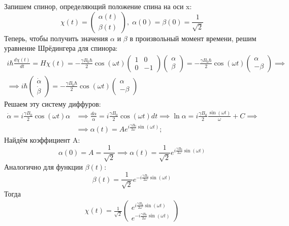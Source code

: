 Запишем спинор, определяющий положение спина на оси x:
\[
\chi(t) = \begin{pmatrix}\alpha(t)\\ \beta(t)\end{pmatrix}, \; \alpha(0) = \beta(0) = \frac{1}{\sqrt{2}}
\]
Теперь, чтобы получить значения $\alpha$ и $\beta$ в произвольный момент времени, решим уравнение Шрёдингера для спинора:
\begin{gather*}
i\hbar\frac{d\chi(t)}{dt} = H\chi(t) = -\frac{\gamma B_0\hbar}{2}\cos(\omega t)\begin{pmatrix} 1 & 0 \\ 0 & -1 \end{pmatrix}\begin{pmatrix}\alpha\\ \beta\end{pmatrix} =  -\frac{\gamma B_0\hbar}{2}\cos(\omega t) \begin{pmatrix} \alpha \\ -\beta \end{pmatrix} \implies \\
\implies i\hbar\begin{pmatrix} \dot{\alpha}\\ \dot{\beta} \end{pmatrix} = -\frac{\gamma B_0\hbar}{2}\cos(\omega t) \begin{pmatrix} \alpha \\ -\beta \end{pmatrix}
\end{gather*}
Решаем эту систему диффуров:
\begin{align*}
    \dot{\alpha} = i\frac{\gamma B_0}{2}\cos(\omega t)\alpha &\implies \frac{d\alpha}{\alpha} = i\frac{\gamma B_0}{2}\cos(\omega t)dt \implies \ln\alpha = i\frac{\gamma B_0}{2}\frac{\sin(\omega t)}{\omega} + C \implies \\ 
    & \implies \alpha(t) = Ae^{i\frac{\gamma B_0}{2\omega}\sin(\omega t)};
\end{align*}
Найдём коэффициент A:
\[
\alpha(0) = A = \frac{1}{\sqrt{2}} \implies \alpha(t) = \frac{1}{\sqrt{2}}e^{i\frac{\gamma B_0}{2\omega}\sin(\omega t)}
\]
Аналогично для функции $\beta(t)$:
\[
\beta(t) = \frac{1}{\sqrt{2}}e^{-i\frac{\gamma B_0}{2\omega}\sin(\omega t)}
\]
Тогда
\begin{align*}
\chi(t) = \frac{1}{\sqrt{2}}\begin{pmatrix} e^{i\frac{\gamma B_0}{2\omega}\sin(\omega t)} \\ e^{-i\frac{\gamma B_0}{2\omega}\sin(\omega t)} \end{pmatrix}
\end{align*}

